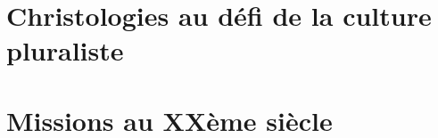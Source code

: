 \documentclass[oneside,10pt]{book}
\begin{document}












%
 
 
\part{Christologies au défi de la culture pluraliste}








\part{Missions au XXème siècle}






%


%
\end{document}
